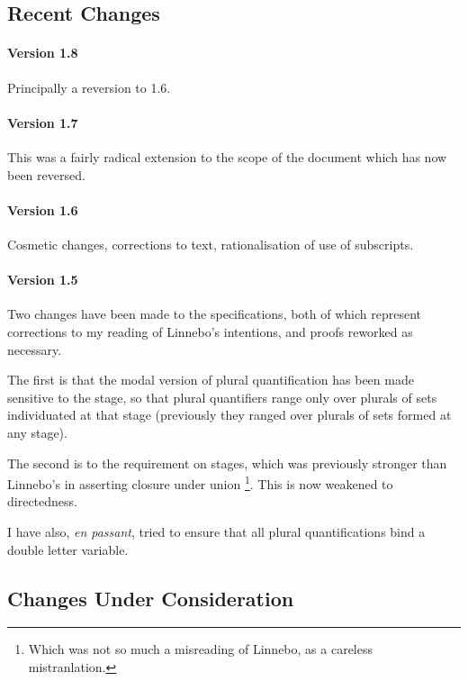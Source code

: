 \documentclass[11pt]{article}
\begin{document}
\subsection{Recent Changes}

\paragraph{Version 1.8}

Principally a reversion to 1.6.

\paragraph{Version 1.7}

This was a fairly radical extension to the scope of the document which has now been reversed.

\paragraph{Version 1.6}

Cosmetic changes, corrections to text, rationalisation of use of subscripts.

\paragraph{Version 1.5}

Two changes have been made to the specifications, both of which represent corrections to my reading of Linnebo's intentions, and proofs reworked as necessary.

The first is that the modal version of plural quantification has been made sensitive to the stage, so that plural quantifiers range only over plurals of sets individuated at that stage (previously they ranged over plurals of sets formed at any stage).

The second is to the requirement on stages, which was previously stronger than Linnebo's in asserting closure under union%
\footnote{Which was not so much a misreading of Linnebo, as a careless mistranlation.}.
This is now weakened to directedness.

I have also, \emph{en passant}, tried to ensure that all plural quantifications bind a double letter variable.

\subsection{Changes Under Consideration}
\end{document}
